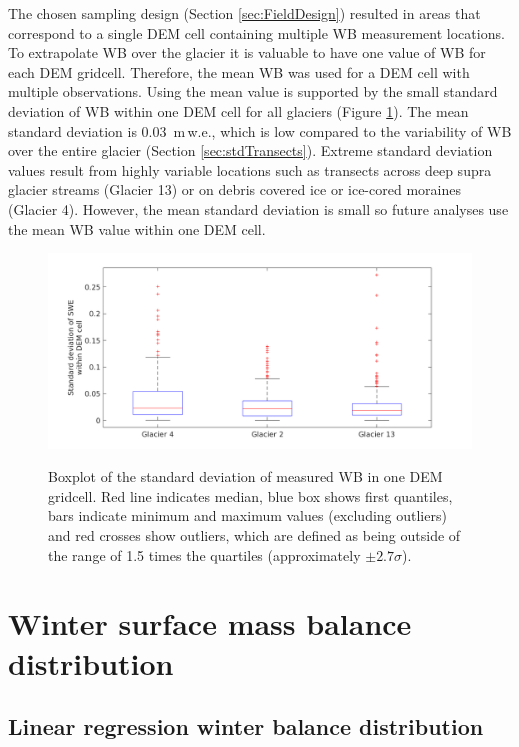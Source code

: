 \documentclass{sfuthesis}
\newcommand{\boxMatlab}{Red line indicates median, blue box shows first quantiles, bars indicate minimum and maximum values (excluding outliers) and red crosses show outliers, which are defined as being outside of the range of 1.5 times the quartiles (approximately $\pm2.7\sigma$). }
\begin{document}
\begin{appendices}
The chosen sampling design (Section \ref{sec:FieldDesign}) resulted in areas that correspond to a single DEM cell containing multiple WB measurement locations. To extrapolate WB over the glacier it is valuable to have one value of WB for each DEM gridcell. Therefore, the mean WB was used for a DEM cell with multiple observations. Using the mean value is supported by the small standard deviation of WB within one DEM cell for all glaciers (Figure \ref{fig:DEMcellSTD}). The mean standard deviation is 0.03 \,m\,w.e., which is low compared to the variability of WB over the entire glacier (Section \ref{sec:stdTransects}). Extreme standard deviation values result from highly variable locations such as transects across deep supra glacier streams (Glacier 13) or on debris covered ice or ice-cored moraines (Glacier 4). However, the mean standard deviation is small so future analyses use the mean WB value within one DEM cell. 

\begin{figure}
	\centering
	\includegraphics[width = \textwidth]{DEMcellSTD.png}\\
	\caption[]{Boxplot of the standard deviation of measured WB in one DEM gridcell. \boxMatlab}
	\label{fig:DEMcellSTD}
\end{figure}


\chapter{Winter surface mass balance distribution}
\pagebreak
\section{Linear regression winter balance distribution}


\end{appendices}
\end{document}
